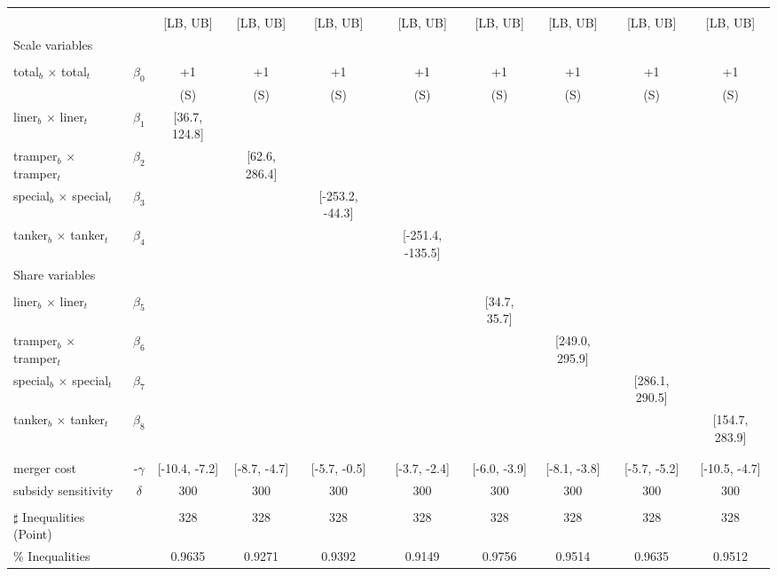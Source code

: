 \begin{tabular}{@{\extracolsep{5pt}}lccccccccc}
\toprule 
 &  &  &  &  &  &  &  &  &  \\
 &  & [LB, UB] & [LB, UB] & [LB, UB] & [LB, UB] & [LB, UB] & [LB, UB] & [LB, UB] & [LB, UB] \\
\midrule 
Scale variables &  &  &  &  &  &  &  \\
 &  &  &  &  &  &  &  &  \\
total$_{b}$ $\times$ total$_{t}$ & $\beta_0$ & +1 & +1 & +1 & +1 & +1 & +1 & +1 & +1 \\
 &  & (S) & (S) & (S) & (S) & (S) & (S) & (S) & (S) \\
liner$_{b}$ $\times$ liner$_{t}$ & $\beta_1$ & [36.7, 124.8] &  &  &  &  &  &  &  \\
tramper$_{b}$ $\times$ tramper$_{t}$ & $\beta_2$ &  & [62.6, 286.4] &  &  &  &  &  &  \\
special$_{b}$ $\times$ special$_{t}$ & $\beta_3$ &  &  & [-253.2, -44.3] &  &  &  &  &  \\
tanker$_{b}$ $\times$ tanker$_{t}$ & $\beta_4$ &  &  &  & [-251.4, -135.5] &  &  &  &  \\
Share variables &  &  &  &  &  &  &  &  &  \\
 &  &  &  &  &  &  &  &  &  \\
liner$_{b}$ $\times$ liner$_{t}$ & $\beta_5$ &  &  &  &  & [34.7, 35.7] &  &  &  \\
tramper$_{b}$ $\times$ tramper$_{t}$ & $\beta_6$ &  &  &  &  &  & [249.0, 295.9] &  &  \\
special$_{b}$ $\times$ special$_{t}$ & $\beta_7$ &  &  &  &  &  &  & [286.1, 290.5] &  \\
tanker$_{b}$ $\times$ tanker$_{t}$ & $\beta_8$ &  &  &  &  &  &  &  & [154.7, 283.9] \\
 &  &  &  &  &  &  &  &  &  \\
 &  &  &  &  &  &  &  &  &  \\
merger cost & -$\gamma$ & [-10.4, -7.2] & [-8.7, -4.7] & [-5.7, -0.5] & [-3.7, -2.4] & [-6.0, -3.9] & [-8.1, -3.8] & [-5.7, -5.2] & [-10.5, -4.7] \\
subsidy sensitivity & $\delta$ & 300 & 300 & 300 & 300 & 300 & 300 & 300 & 300 \\
 &  &  &  &  &  &  &  &  &  \\
\hline 
$\sharp$ Inequalities (Point) &  & 328 & 328 & 328 & 328 & 328 & 328 & 328 & 328 \\
\% Inequalities &  & 0.9635 & 0.9271 & 0.9392 & 0.9149 & 0.9756 & 0.9514 & 0.9635 & 0.9512 \\
\bottomrule 
\end{tabular}
